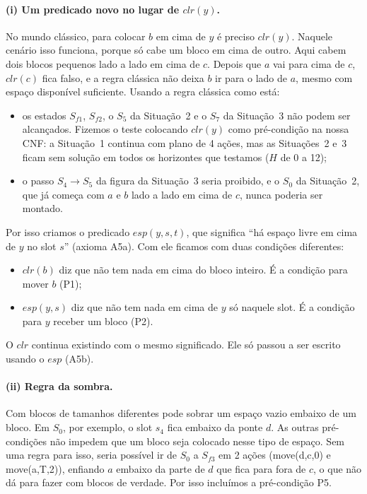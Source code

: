 \documentclass[11pt,a4paper]{article}
\newcommand{\clr}{\mathit{clr}}
\newcommand{\esp}{\mathit{esp}}
\begin{document}
\paragraph{(i) Um predicado novo no lugar de \texorpdfstring{$\clr(y)$}{clr(y)}.}
No mundo clássico, para colocar $b$ em cima de $y$ é preciso $\clr(y)$. Naquele cenário isso
funciona, porque só cabe um bloco em cima de outro. Aqui cabem dois blocos pequenos
lado a lado em cima de $c$. Depois que $a$ vai para cima de $c$, $\clr(c)$ fica
falso, e a regra clássica não deixa $b$ ir para o lado de $a$, mesmo com espaço disponível suficiente.
Usando a regra clássica como está:
\begin{itemize}
  \item os estados $S_{f1}$, $S_{f2}$, o $S_5$ da Situação~2 e o $S_7$ da Situação~3
        não podem ser alcançados. Fizemos o teste colocando $\clr(y)$ como
        pré-condição na nossa CNF: a Situação~1 continua com plano de 4 ações, mas
        as Situações~2 e~3 ficam sem solução em todos os horizontes que testamos
        ($H$ de 0 a 12);
  \item o passo $S_4\to S_5$ da figura da Situação~3 seria proibido, e o $S_0$ da
        Situação~2, que já começa com $a$ e $b$ lado a lado em cima de $c$, nunca
        poderia ser montado.
\end{itemize}
Por isso criamos o predicado $\esp(y,s,t)$, que significa ``há espaço livre em cima
de $y$ no slot $s$'' (axioma A5a). Com ele ficamos com duas condições diferentes:
\begin{itemize}
  \item $\clr(b)$ diz que não tem nada em cima do bloco inteiro. É a condição para
        mover $b$ (P1);
  \item $\esp(y,s)$ diz que não tem nada em cima de $y$ só naquele slot. É a
        condição para $y$ receber um bloco (P2).
\end{itemize}
O $\clr$ continua existindo com o mesmo significado. Ele só passou a ser escrito
usando o $\esp$ (A5b).

\paragraph{(ii) Regra da sombra.} Com blocos de tamanhos diferentes pode sobrar um
espaço vazio embaixo de um bloco. Em $S_0$, por exemplo, o slot $s_4$ fica embaixo
da ponte $d$. As outras pré-condições não impedem que um bloco seja colocado nesse
tipo de espaço. Sem uma regra para isso, seria possível ir de $S_0$ a $S_{f3}$ em 2 ações
(move(d,c,0) e move(a,T,2)),
enfiando $a$ embaixo da parte de $d$ que fica para fora de $c$, o que não dá para
fazer com blocos de verdade. Por isso incluímos a pré-condição P5.
\end{document}
